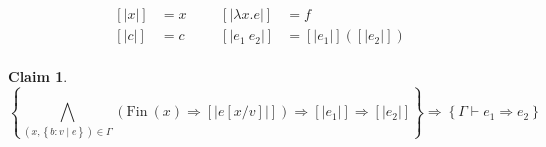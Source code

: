 \documentclass[10pt,a4paper]{article}
\newtheorem{claim}{Claim}
\newcommand\efun[2]{\ensuremath{\lambda #1 . #2}}
\newcommand\eapp[2]{\ensuremath{#1 \ #2}}
\newcommand\tref[3]{\ensuremath{\left\lbrace {#1} \colon {#2} \mid {#3} \right\rbrace}}
\newcommand\fin[1]{\ensuremath{\text{Fin}\ (#1)}}
\newcommand\sub[2]{\ensuremath{\left[ #2 / #1 \right]}}
\newcommand\interp[1]{\ensuremath{[|#1|]}}
\newcommand\issubref[3]{\ensuremath{#1 \vdash #2 \Rightarrow #3}}
\begin{document}
\begin{align*}
\interp{x}&=x &&&
\interp{\efun{x}{e}}&=f\\
\interp{c}&=c &&&
\interp{\eapp{e_1}{e_2}}&=\interp{e_1}(\interp{e_2})\\
\end{align*}



\begin{claim}
$$
\left\lbrace	
	\bigwedge_{(x,\tref{b}{v}{e})\in\Gamma}(\fin{x}\Rightarrow \interp{e\sub{v}{x}})
	\Rightarrow \interp{e_1}
	\Rightarrow \interp{e_2}
\right\rbrace
\Rightarrow
\left\lbrace	
\issubref{\Gamma}{e_1}{e_2}
\right\rbrace
$$
\end{claim}
\end{document}
